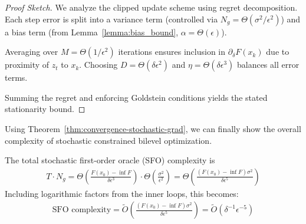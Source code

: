 \documentclass[letterpaper]{article} %
\newcommand{\1}{\mathbf{1}}
\begin{document}
\begin{proof}[Proof Sketch]
We analyze the clipped update scheme using regret decomposition. Each step error is split into a variance term (controlled via $N_g = \Theta(\sigma^2/\epsilon^2)$) and a bias term (from Lemma~\ref{lemma:bias_bound}, $\alpha = \Theta(\epsilon)$).

Averaging over $M = \Theta(1/\epsilon^2)$ iterations ensures inclusion in $\partial_\delta F(x_k)$ due to proximity of $z_t$ to $x_k$. Choosing $D = \Theta(\delta\epsilon^2)$ and $\eta = \Theta(\delta\epsilon^3)$ balances all error terms.

Summing the regret and enforcing Goldstein conditions yields the stated stationarity bound.
\end{proof}



Using Theorem~\ref{thm:convergence-stochastic-grad}, we can finally show the overall complexity of stochastic constrained bilevel optimization.
\begin{theorem}
The total stochastic first-order oracle (SFO) complexity is 
\begin{align}
T \cdot N_g = \Theta\left(\frac{F(x_0) - \inf F}{\delta\epsilon^3}\right) \cdot \Theta\left(\frac{\sigma^2}{\epsilon^2}\right) = \Theta\left(\frac{(F(x_0) - \inf F) \sigma^2}{\delta\epsilon^5}\right) \label{eq:SFO_A_thm}
\end{align}
Including logarithmic factors from the inner loops, this becomes:
\begin{align}
\text{SFO complexity} = \tilde{O}\left(\frac{(F(x_0) - \inf F) \sigma^2}{\delta\epsilon^5}\right)= \tilde{O}(\delta^{-1}\epsilon^{-5})\label{eq:SFO_A_tilde_thm}
\end{align}
\end{theorem}
\end{document}
